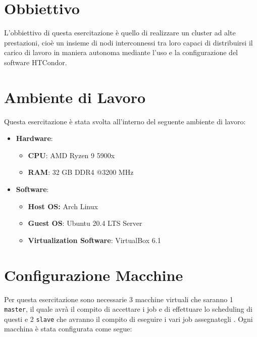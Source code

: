 \section{Obbiettivo}

L'obbiettivo di questa esercitazione \`{e} quello di realizzare un cluster ad alte prestazioni, cioè un insieme di nodi interconnessi tra loro capaci di distribuirsi il carico di lavoro in maniera autonoma mediante l'uso e la configurazione del software HTCondor.

\section{Ambiente di Lavoro}

Questa esercitazione \`{e} stata svolta all'interno del seguente ambiente di lavoro:

\begin{itemize}
	\item \textbf{Hardware}: 
		\begin{itemize}
			\item \textbf{CPU}: AMD Ryzen 9 5900x
			\item \textbf{RAM}: 32 GB DDR4 @3200 MHz
		\end{itemize}
	\item \textbf{Software}:
		\begin{itemize}
			\item \textbf{Host OS:} Arch Linux
			\item \textbf{Guest OS}: Ubuntu 20.4 LTS Server
			\item \textbf{Virtualization Software}: VirtualBox 6.1
		\end{itemize}
\end{itemize}

\section{Configurazione Macchine}

Per questa esercitazione sono necessarie 3 macchine virtuali che saranno 1 \lstinline[style=cmd]|master|, il quale avr\`{a} il compito di accettare i job e di effettuare lo scheduling di questi e 2 \lstinline[style=cmd]|slave| che avranno il compito di eseguire i vari job assegnategli . Ogni macchina \`{e} stata configurata come segue:

